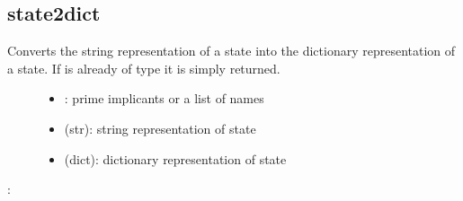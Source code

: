 \documentclass[letterpaper,10pt,english]{sphinxmanual}
\begin{document}
\subsection{state2dict}
\label{\detokenize{StateTransitionGraphs:id10}}\label{\detokenize{StateTransitionGraphs:state2dict}}

\begin{fulllineitems}
\label{\detokenize{StateTransitionGraphs:PyBoolNet.StateTransitionGraphs.state2dict}}
Converts the string representation of a state into the dictionary representation of a state.
If  is already of type  it is simply returned.
\begin{description}
\item[{}] \leavevmode\begin{itemize}
\item {} 
: prime implicants or a list of names

\item {} 
 (str): string representation of state

\end{itemize}

\item[{}] \leavevmode\begin{itemize}
\item {} 
 (dict): dictionary representation of state

\end{itemize}

\end{description}

:

\begin{sphinxVerbatim}[commandchars=\\\{\}]
  
 
\end{sphinxVerbatim}

\end{fulllineitems}
\end{document}
